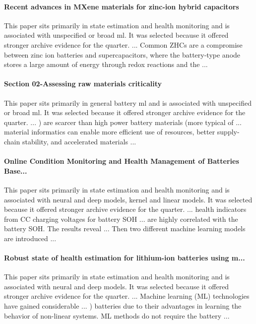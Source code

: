 \documentclass[conference]{IEEEtran}
\begin{document}
\paragraph{Recent advances in MXene materials for zinc-ion hybrid capacitors} This paper sits primarily in state estimation and health monitoring and is associated with unspecified or broad ml. It was selected because it offered stronger archive evidence for the quarter. ... Common ZHCs are a compromise between zinc ion batteries and supercapacitors, where the battery-type anode stores a large amount of energy through redox reactions and the ... \cite{recentadvancesin2025}

\paragraph{Section 02-Assessing raw materials criticality} This paper sits primarily in general battery ml and is associated with unspecified or broad ml. It was selected because it offered stronger archive evidence for the quarter. ... ) are scarcer than high power battery materials (more typical of ... material informatics can enable more efficient use of resources, better supply-chain stability, and accelerated materials ... \cite{section02assessingna}

\paragraph{Online Condition Monitoring and Health Management of Batteries Base...} This paper sits primarily in state estimation and health monitoring and is associated with neural and deep models, kernel and linear models. It was selected because it offered stronger archive evidence for the quarter. ... health indicators from CC charging voltages for battery SOH ... are highly correlated with the battery SOH. The results reveal ... Then two different machine learning models are introduced ... \cite{onlineconditionmonitorin2022}

\paragraph{Robust state of health estimation for lithium-ion batteries using m...} This paper sits primarily in state estimation and health monitoring and is associated with neural and deep models. It was selected because it offered stronger archive evidence for the quarter. ... Machine learning (ML) technologies have gained considerable ... ) batteries due to their advantages in learning the behavior of non-linear systems. ML methods do not require the battery ... \cite{robuststateof2022}
\end{document}
